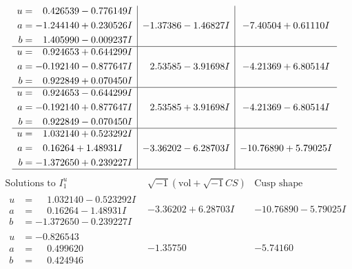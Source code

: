 \documentclass[1p]{elsarticle_modified}
\theoremstyle{definition}
\newcommand{\I}{\sqrt{-1}}
\begin{document}
$$\begin{array}{c|c|c}
\begin{aligned}
u &= \phantom{-}0.426539 - 0.776149 I \\
a &= -1.244140 + 0.230526 I \\
b &= \phantom{-}1.405990 - 0.009237 I\end{aligned}
 & -1.37386 - 1.46827 I & -7.40504 + 0.61110 I \\ \hline\begin{aligned}
u &= \phantom{-}0.924653 + 0.644299 I \\
a &= -0.192140 - 0.877647 I \\
b &= \phantom{-}0.922849 + 0.070450 I\end{aligned}
 & \phantom{-}2.53585 - 3.91698 I & -4.21369 + 6.80514 I \\ \hline\begin{aligned}
u &= \phantom{-}0.924653 - 0.644299 I \\
a &= -0.192140 + 0.877647 I \\
b &= \phantom{-}0.922849 - 0.070450 I\end{aligned}
 & \phantom{-}2.53585 + 3.91698 I & -4.21369 - 6.80514 I \\ \hline\begin{aligned}
u &= \phantom{-}1.032140 + 0.523292 I \\
a &= \phantom{-}0.16264 + 1.48931 I \\
b &= -1.372650 + 0.239227 I\end{aligned}
 & -3.36202 - 6.28703 I & -10.76890 + 5.79025 I\\
 \hline 
 \end{array}$$\newpage$$\begin{array}{c|c|c}  
\text{Solutions to }I^u_{1}& \I (\text{vol} + \sqrt{-1}CS) & \text{Cusp shape}\\
 \hline 
\begin{aligned}
u &= \phantom{-}1.032140 - 0.523292 I \\
a &= \phantom{-}0.16264 - 1.48931 I \\
b &= -1.372650 - 0.239227 I\end{aligned}
 & -3.36202 + 6.28703 I & -10.76890 - 5.79025 I \\ \hline\begin{aligned}
u &= -0.826543\phantom{ +0.000000I} \\
a &= \phantom{-}0.499620\phantom{ +0.000000I} \\
b &= \phantom{-}0.424946\phantom{ +0.000000I}\end{aligned}
 & -1.35750\phantom{ +0.000000I} & -5.74160\phantom{ +0.000000I} \\ \hline\begin{aligned}

\end{aligned}
\end{array}$$
\end{document}

